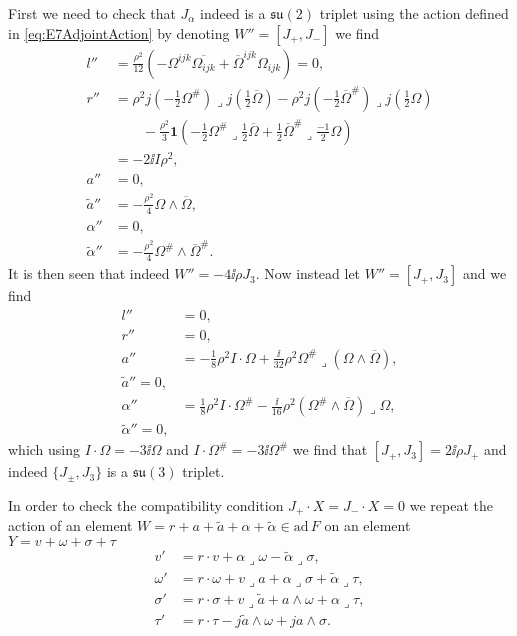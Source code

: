 First we need to check that $J_\alpha$ indeed is a $\mathfrak{su}(2)$ triplet using the action defined in \eqref{eq:E7AdjointAction} by denoting $W''=[J_+,J_-]$ we find 
\begin{equation}
    \begin{aligned}
        l''&= \frac{\rho^2}{12}(-\Omega^{ijk}\overbar{\Omega_{ijk}}+\overbar{\Omega}^{ijk}\Omega_{ijk}) = 0,\\
        r''&= \rho^2j(-\frac{1}{2}\Omega^{\#})\lrcorner j(\frac{1}{2}\overbar{\Omega})-\rho^2j(-\frac{1}{2}\overbar{\Omega}^{\#})\lrcorner j(\frac{1}{2}\Omega)\\
        &\qquad -\frac{\rho^2}{3}\mathbf{1}(-\frac{1}{2}\Omega^{\#}\lrcorner\frac{1}{2}\overbar{\Omega}+\frac{1}{2}\overbar{\Omega}^{\#}\lrcorner\frac{-1}{2}\Omega)\\
        &= -2\ii I\rho^2,\\
        a''&=0,\\
        \tilde{a}'' &= -\frac{\rho^2}{4}\Omega\wedge\overbar{\Omega},\\
        \alpha'' &= 0,\\
        \tilde{\alpha}'' &= -\frac{\rho^2}{4}\Omega^{\#}\wedge\overbar{\Omega}^{\#}.
    \end{aligned}
\end{equation}
It is then seen that indeed $W''=-4\ii\rho J_3$. Now instead let $W''=[J_+,J_3]$ and we find 
\begin{equation}
    \begin{aligned}
        l'' &= 0,\\
        r'' &= 0,\\
        a'' &= -\frac{1}{8}\rho^2 I\cdot \Omega+\frac{\ii}{32}\rho^2\Omega^{\#}\lrcorner (\Omega\wedge\overbar{\Omega}),\\
        \tilde{a}'' = 0,\\
        \alpha '' &= \frac{1}{8}\rho^2 I\cdot \Omega^{\#}-\frac{\ii}{16}\rho^2(\Omega^{\#}\wedge\overbar{\Omega})\lrcorner\Omega,\\
        \tilde{\alpha}'' = 0,
    \end{aligned}
\end{equation}
which using $I\cdot \Omega=-3\ii\Omega$ and $I\cdot \Omega^{\#}=-3\ii\Omega^{\#}$ we find that $[J_+,J_3]=2\ii\rho J_+$ and indeed $\{J_\pm,J_3\}$ is a $\mathfrak{su}(3)$ triplet. 

In order to check the compatibility condition $J_+\cdot X=J_-\cdot X=0$ we repeat the action of an element $W=r+a+\tilde{a}+\alpha+\tilde{\alpha}\in\text{ad}\,F$ on an element $Y=v+\omega+\sigma+\tau$
\begin{equation}\label{eq:E7action}
    \begin{aligned}
        v'&= r\cdot v+\alpha\lrcorner\omega-\tilde{\alpha}\lrcorner\sigma,\\
        \omega'&=r\cdot \omega+v\lrcorner a+\alpha\lrcorner\sigma+\tilde{\alpha}\lrcorner\tau,\\
        \sigma'&= r\cdot \sigma+v\lrcorner\tilde{a}+a\wedge\omega+\alpha\lrcorner\tau,\\
        \tau'&= r\cdot\tau-j\tilde{a}\wedge\omega+ja\wedge\sigma.
    \end{aligned}
\end{equation}

